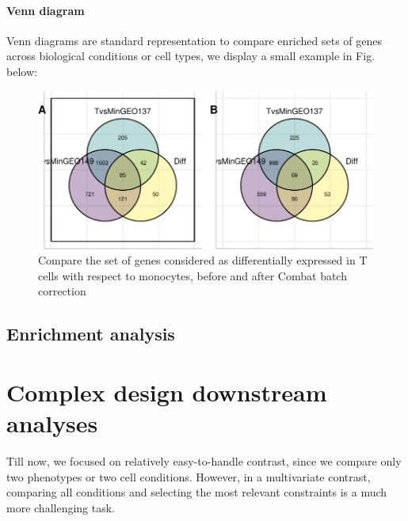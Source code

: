 \paragraph{Venn diagram}
\label{venn-diagram}

Venn diagrams are standard representation to compare enriched sets of genes across biological conditions or cell types, we display a small example in Fig.  below:

\begin{figure}

{\centering \includegraphics[width=0.9\linewidth]{figure-latex/venn-diagram-1} 

}

\caption{Compare the set of genes considered as differentially expressed in T cells with respect to monocytes, before and after Combat batch correction}\label{fig:venn-diagram}
\end{figure}

\subsection{Enrichment analysis}


\section{Complex design downstream analyses} 
\label{complex-design-downstream-analyses}


Till now, we focused on relatively easy-to-handle contrast, since we compare only two phenotypes or two cell conditions. However, in a multivariate contrast, comparing all conditions and selecting the most relevant constraints is a much more challenging task.

